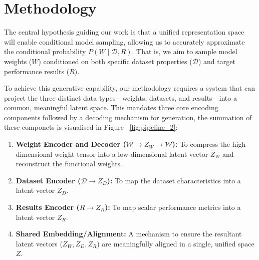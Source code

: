 \graphicspath{{fig/}}

\chapter{Methodology}
\label{chap:method}


The central hypothesis guiding our work is that a unified representation space will enable conditional model sampling, allowing us to accurately approximate the conditional probability $P(W \mid \mathcal{D}, R)$. That is, we aim to sample model weights ($W$) conditioned on both specific dataset properties ($\mathcal{D}$) and target performance results ($R$).

To achieve this generative capability, our methodology requires a system that can project the three distinct data types—weights, datasets, and results—into a common, meaningful latent space. This mandates three core encoding components followed by a decoding mechanism for generation, the summation of these componets is visualised in Figure ~\ref{fig:pipeline_2}:

\begin{enumerate}
    \item \textbf{Weight Encoder and Decoder ($\mathcal{W} \rightarrow Z_W \rightarrow \mathcal{W}$):} To compress the high-dimensional weight tensor into a low-dimensional latent vector $Z_W$ and reconstruct the functional weights.
    \item \textbf{Dataset Encoder ($\mathcal{D} \rightarrow Z_D$):} To map the dataset characteristics into a latent vector $Z_D$.
    \item \textbf{Results Encoder ($R \rightarrow Z_R$):} To map scalar performance metrics into a latent vector $Z_R$.
    \item \textbf{Shared Embedding/Alignment:} A mechanism to ensure the resultant latent vectors ($Z_W, Z_D, Z_R$) are meaningfully aligned in a single, unified space $Z$.
\end{enumerate}

